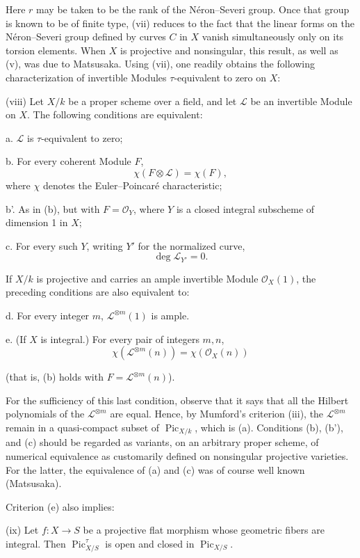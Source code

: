 Here $r$ may be taken to be the rank of the Néron--Severi group. Once that
group is known to be of finite type, (vii) reduces to the fact that the linear
forms on the Néron--Severi group defined by curves $C$ in $X$ vanish
simultaneously only on its torsion elements. When $X$ is projective and
nonsingular, this result, as well as (v), was due to Matsusaka. Using (vii),
one readily obtains the following characterization of invertible Modules
$\tau$-equivalent to zero on $X$:

\medskip
\noindent(viii) Let $X/k$ be a proper scheme over a field, and let
$\mathcal L$ be an invertible Module on $X$. The following conditions are
equivalent:

\noindent a. $\mathcal L$ is $\tau$-equivalent to zero;

\noindent b. For every coherent Module $F$,
\[
\chi(F\otimes\mathcal L)=\chi(F),
\]
where $\chi$ denotes the Euler--Poincaré characteristic;

\noindent b'. As in (b), but with $F=\mathcal O_Y$, where $Y$ is a closed
integral subscheme of dimension 1 in $X$;

\noindent c. For every such $Y$, writing $Y'$ for the normalized curve,
\[
\deg\mathcal L_{Y'}=0.
\]

If $X/k$ is projective and carries an ample invertible Module
$\mathcal O_X(1)$, the preceding conditions are also equivalent to:

\noindent d. For every integer $m$, $\mathcal L^{\otimes m}(1)$ is ample.

\noindent e. (If $X$ is integral.) For every pair of integers $m,n$,
\[
\chi(\mathcal L^{\otimes m}(n))=\chi(\mathcal O_X(n))
\]

(that is, (b) holds with $F=\mathcal L^{\otimes m}(n)$).

For the sufficiency of this last condition, observe that it says that all the
Hilbert polynomials of the $\mathcal L^{\otimes m}$ are equal. Hence, by
Mumford's criterion (iii), the $\mathcal L^{\otimes m}$ remain in a
quasi-compact subset of $\operatorname{Pic}_{X/k}$, which is (a). Conditions
(b), (b'), and (c) should be regarded as variants, on an arbitrary proper
scheme, of numerical equivalence as customarily defined on nonsingular
projective varieties. For the latter, the equivalence of (a) and (c) was of
course well known (Matsusaka).

Criterion (e) also implies:

\medskip
\noindent(ix) Let $f:X\longrightarrow S$ be a projective flat morphism whose
geometric fibers are integral. Then $\operatorname{Pic}_{X/S}^\tau$ is open
and closed in $\operatorname{Pic}_{X/S}$.

